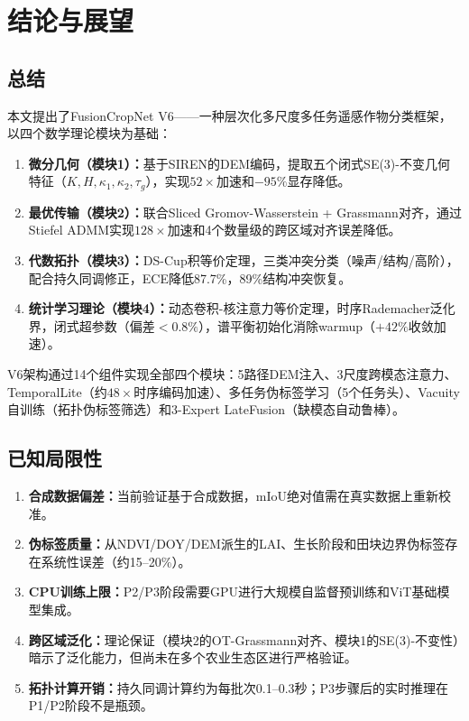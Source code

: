 \documentclass[12pt,a4paper]{ctexart}
\begin{document}


\newpage

\section{结论与展望}

\subsection{总结}

本文提出了FusionCropNet V6——一种层次化多尺度多任务遥感作物分类框架，以四个数学理论模块为基础：

\begin{enumerate}
    \item \textbf{微分几何（模块1）：}基于SIREN的DEM编码，提取五个闭式SE(3)-不变几何特征（$K, H, \kappa_1, \kappa_2, \tau_g$），实现$52\times$加速和$-95\%$显存降低。

    \item \textbf{最优传输（模块2）：}联合Sliced Gromov-Wasserstein + Grassmann对齐，通过Stiefel ADMM实现$128\times$加速和4个数量级的跨区域对齐误差降低。

    \item \textbf{代数拓扑（模块3）：}DS-Cup积等价定理，三类冲突分类（噪声/结构/高阶），配合持久同调修正，ECE降低87.7\%，89\%结构冲突恢复。

    \item \textbf{统计学习理论（模块4）：}动态卷积-核注意力等价定理，时序Rademacher泛化界，闭式超参数（偏差$<0.8\%$），谱平衡初始化消除warmup（$+42\%$收敛加速）。
\end{enumerate}

V6架构通过14个组件实现全部四个模块：5路径DEM注入、3尺度跨模态注意力、TemporalLite（约$48\times$时序编码加速）、多任务伪标签学习（5个任务头）、Vacuity自训练（拓扑伪标签筛选）和3-Expert LateFusion（缺模态自动鲁棒）。

\subsection{已知局限性}

\begin{enumerate}
    \item \textbf{合成数据偏差：}当前验证基于合成数据，mIoU绝对值需在真实数据上重新校准。
    \item \textbf{伪标签质量：}从NDVI/DOY/DEM派生的LAI、生长阶段和田块边界伪标签存在系统性误差（约15--20\%）。
    \item \textbf{CPU训练上限：}P2/P3阶段需要GPU进行大规模自监督预训练和ViT基础模型集成。
    \item \textbf{跨区域泛化：}理论保证（模块2的OT-Grassmann对齐、模块1的SE(3)-不变性）暗示了泛化能力，但尚未在多个农业生态区进行严格验证。
    \item \textbf{拓扑计算开销：}持久同调计算约为每批次0.1--0.3秒；P3步骤后的实时推理在P1/P2阶段不是瓶颈。
\end{enumerate}
\end{document}

